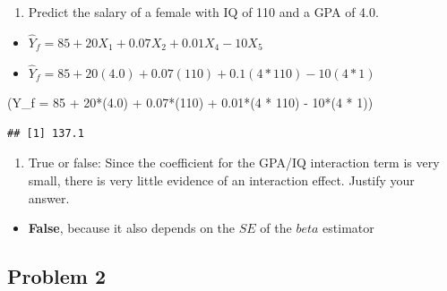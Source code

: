\documentclass[
]{article}
\newenvironment{Shaded}{\begin{snugshade}}{\end{snugshade}}
\newcommand{\AttributeTok}[1]{\textcolor[rgb]{0.77,0.63,0.00}{#1}}
\newcommand{\DecValTok}[1]{\textcolor[rgb]{0.00,0.00,0.81}{#1}}
\newcommand{\FloatTok}[1]{\textcolor[rgb]{0.00,0.00,0.81}{#1}}
\newcommand{\NormalTok}[1]{#1}
\newcommand{\SpecialCharTok}[1]{\textcolor[rgb]{0.00,0.00,0.00}{#1}}
\providecommand{\tightlist}{%
  \setlength{\itemsep}{0pt}\setlength{\parskip}{0pt}}
\begin{document}
\begin{enumerate}
\def\labelenumi{(\alph{enumi})}
\setcounter{enumi}{1}
\tightlist
\item
  Predict the salary of a female with IQ of 110 and a GPA of 4.0.
\end{enumerate}

\begin{itemize}
\tightlist
\item
  \(\hat{Y}_f = 85 + 20X_1 + 0.07X_2 + 0.01X_4 - 10X_5\)
\item
  \(\hat{Y}_f = 85 + 20(4.0) + 0.07(110) + 0.1(4 * 110) - 10(4 * 1)\)
\end{itemize}

\begin{Shaded}
\begin{Highlighting}[]
\NormalTok{(}\AttributeTok{Y\_f =} \DecValTok{85} \SpecialCharTok{+} \DecValTok{20}\SpecialCharTok{*}\NormalTok{(}\FloatTok{4.0}\NormalTok{) }\SpecialCharTok{+} \FloatTok{0.07}\SpecialCharTok{*}\NormalTok{(}\DecValTok{110}\NormalTok{) }\SpecialCharTok{+} \FloatTok{0.01}\SpecialCharTok{*}\NormalTok{(}\DecValTok{4} \SpecialCharTok{*} \DecValTok{110}\NormalTok{) }\SpecialCharTok{{-}} \DecValTok{10}\SpecialCharTok{*}\NormalTok{(}\DecValTok{4} \SpecialCharTok{*} \DecValTok{1}\NormalTok{))}
\end{Highlighting}
\end{Shaded}

\begin{verbatim}
## [1] 137.1
\end{verbatim}

\begin{enumerate}
\def\labelenumi{(\alph{enumi})}
\setcounter{enumi}{2}
\tightlist
\item
  True or false: Since the coefficient for the GPA/IQ interaction term
  is very small, there is very little evidence of an interaction effect.
  Justify your answer.
\end{enumerate}

\begin{itemize}
\tightlist
\item
  \textbf{False}, because it also depends on the \(SE\) of the \(beta\)
  estimator
\end{itemize}

\hypertarget{problem-2}{%
\subsection{Problem 2}\label{problem-2}}
\end{document}
